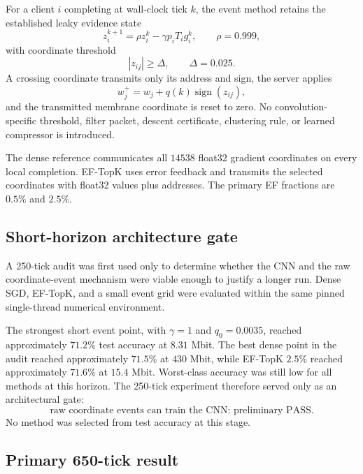 For a client $i$ completing at wall-clock tick $k$, the event method retains the established leaky evidence state
\begin{equation}
z_i^{k+1}=\rho z_i^k-\gamma p_iT_i g_i^k,
\qquad \rho=0.999,
\end{equation}
with coordinate threshold
\begin{equation}
|z_{ij}|\ge\Delta,
\qquad \Delta=0.025.
\end{equation}
A crossing coordinate transmits only its address and sign, the server applies
\begin{equation}
w_j^+=w_j+q(k)\operatorname{sign}(z_{ij}),
\end{equation}
and the transmitted membrane coordinate is reset to zero. No convolution-specific threshold, filter packet, descent certificate, clustering rule, or learned compressor is introduced.

The dense reference communicates all $14538$ float32 gradient coordinates on every local completion. EF-TopK uses error feedback and transmits the selected coordinates with float32 values plus addresses. The primary EF fractions are $0.5\%$ and $2.5\%$.

\subsection{Short-horizon architecture gate}

A 250-tick audit was first used only to determine whether the CNN and the raw coordinate-event mechanism were viable enough to justify a longer run. Dense SGD, EF-TopK, and a small event grid were evaluated within the same pinned single-thread numerical environment.

The strongest short event point, with $\gamma=1$ and $q_0=0.0035$, reached approximately $71.2\%$ test accuracy at $8.31$ Mbit. The best dense point in the audit reached approximately $71.5\%$ at $430$ Mbit, while EF-TopK $2.5\%$ reached approximately $71.6\%$ at $15.4$ Mbit. Worst-class accuracy was still low for all methods at this horizon. The 250-tick experiment therefore served only as an architectural gate:
\begin{equation}
\boxed{\text{raw coordinate events can train the CNN: preliminary PASS}.}
\end{equation}
No method was selected from test accuracy at this stage.

\subsection{Primary 650-tick result}

